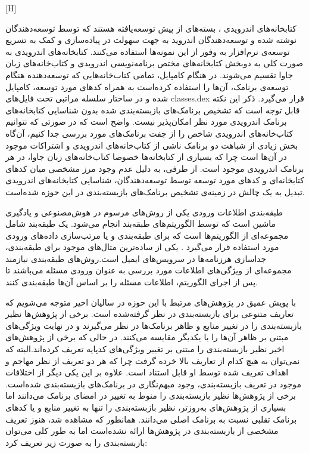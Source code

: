 

[H]
\vspace{1em}

کتابخانه‌های اندرویدی ، بسته‌های از پیش توسعه‌یافته هستند که توسط توسعه‌دهندگان نوشته شده و توسعه‌دهندگان اندروید به جهت سهولت در پیاده‌سازی و کمک به تسریع توسعه‌ی نرم‌افزار به وفور از این نمونه‌ها استفاده می‌کنند. کتابخانه‌های اندرویدی به صورت کلی به دوبخش کتابخانه‌های مختص برنامه‌نویسی اندرویدی و کتاب‌خانه‌های زبان جاوا تقسیم می‌شوند. در هنگام کامپایل، تمامی کتاب‌خانه‌هایی که توسعه‌دهنده هنگام توسعه‌ی برنامک، آن‌ها را استفاده کرده‌است به همراه کد‌های مورد توسعه، کامپایل شده و در ساختار سلسله مراتبی تحت فایل‌های {classes.dex} قرار می‌گیرد. ذکر این نکته‌ قابل توجه است که تشخیص برنامک‌های بازبسته‌بندی شده بدون شناسایی کتابخانه‌های برنامک‌ اندرویدی مورد نظر امکان‌پذیر نیست. واضح است که در صورتی که نتوانیم کتاب‌خانه‌های اندرویدی شاخص را از جفت برنامک‌های مورد بررسی جدا کنیم، آن‌گاه بخش زیادی از شباهت دو برنامک ناشی از کتاب‌خانه‌های اندرویدی و اشتراکات موجود در آن‌ها است چرا که بسیاری از کتابخانه‌ها خصوصا کتاب‌خانه‌های زبان جاوا، در هر برنامک اندرویدی موجود است. از طرفی، به دلیل عدم وجود مرز مشخصی میان کد‌های کتابخانه‌ای و کد‌های مورد توسعه توسط توسعه‌دهندگان، شناسایی کتابخانه‌های اندرویدی  تبدیل به یک چالش در زمینه‌ی تشخیص برنامک‌های بازبسته‌بندی در این حوزه شده‌است.

طبقه‌بندی اطلاعات ورودی یکی از روش‌های مرسوم در هوش‌مصنوعی و یاد‌گیری ماشین است که توسط الگوریتم‌های طبقه‌بند انجام می‌شود. یک طبقه‌بند شامل مجموعه‌ای از الگوریتم‌ها است که برای طبقه‌بندی و یا مرتب‌سازی داده‌های ورودی مورد استفاده قرار می‌گیرد . یکی از ساده‌ترین مثال‌های موجود برای طبقه‌بندی، جدا‌سازی هرزنامه‌ها در سرویس‌های ایمیل است.روش‌های طبقه‌بندی نیازمند مجموعه‌ای از ویژگی‌های اطلاعات مورد بررسی به عنوان ورودی مسئله‌ می‌باشند تا پس از اجرای الگوریتم، اطلاعات مسئله‌ را بر اساس آن‌ها طبقه‌بندی کنند.



با پویش عمیق در پژوهش‌های مرتبط با این حوزه در سالیان اخیر متوجه می‌شویم که تعاریف متنوعی برای بازبسته‌بندی در نظر گرفته‌شده است. برخی از پژوهش‌ها نظیر  بازبسته‌بندی را در تغییر منابع و ظاهر برنامک‌ها در نظر می‌گیرند و در نهایت ویژگی‌های مبتنی بر ظاهر آن‌ها را با یکدیگر مقایسه می‌کنند. در حالی که برخی از پژوهش‌های اخیر نظیر  بازبسته‌بندی را مبتنی بر تغییر ویژگی‌های کد‌پایه تعریف کرده‌اند.البته که نمی‌توان به هیچ کدام از تعاریف بالا خرده گرفت چرا که هر دو تعریف از نظر مهاجم و اهداف تعریف شده توسط او قابل استناد است.
 علاوه بر این یکی دیگر از اختلافات موجود در تعریف بازبسته‌بندی، وجود مبهم‌نگاری در برنامک‌های بازبسته‌بندی شده‌است. برخی از پژوهش‌ها نظیر  بازبسته‌بندی را منوط به تغییر در امضای برنامک می‌دانند اما بسیاری از پژوهش‌های به‌روز‌تر، نظیر  بازبسته‌بندی را تنها به تغییر منابع و یا کد‌های برنامک تقلبی نسبت به برنامک اصلی می‌دانند. همانطور که مشاهده‌ شد، هنوز تعریف مشخصی از بازبسته‌بندی در پژوهش‌ها ارائه‌ نشده‌است اما به طور کلی می‌توان بازبسته‌بندی را به صورت زیر تعریف کرد:

